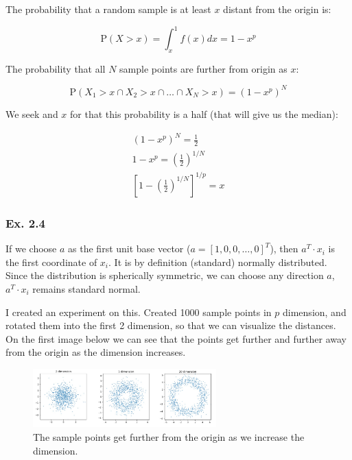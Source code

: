 \documentclass{article}
\begin{document}
The probability that a random sample is at least $x$ distant from the origin is:

\begin{equation}
    \text{P}(X > x) = \int_{x}^{1} f(x)dx = 1 - x^p
\end{equation}

The probability that all $N$ sample points are further from origin as $x$:

\begin{equation}
    \text{P}(X_1 > x \cap X_2 > x \cap \dots \cap X_N > x) = \left( 1 - x^p \right)^N
\end{equation}

We seek and $x$ for that this probability is a half (that will give us the median):

\begin{equation}
  \begin{split}
    \left( 1 - x^p \right)^N = \frac 12\\
    1 - x^p = \left(\frac 12\right)^{1/N}\\
    \left[1 - \left(\frac 12\right)^{1/N}\right]^{1/p} = x
  \end{split}
\end{equation}


\subsubsection{Ex. 2.4}

If we choose $a$ as the first unit base vector ($a=[1,0,0,\dots,0]^T$), then $a^T \cdot x_i$ is the first coordinate of $x_i$. It is by definition (standard) normally distributed. Since the distribution is spherically symmetric, we can choose any direction $a$, $a^T \cdot x_i$ remains standard normal.

I created an experiment on this. Created 1000 sample points in $p$ dimension, and rotated them into the first 2 dimension, so that we can visualize the distances. On the first image below we can see that the points get further and further away from the origin as the dimension increases.

\begin{figure}[ht]
 \centering
  \includegraphics[width=200pt]{images/ex2_2_origin.jpg}
 \caption{The sample points get further from the origin as we increase the dimension.}
\end{figure}
\end{document}
